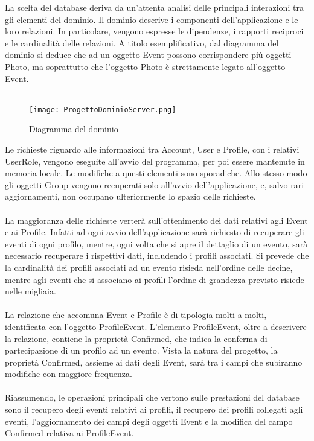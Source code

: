 La scelta del database deriva da un’attenta analisi delle principali interazioni tra gli elementi del dominio. 
Il dominio descrive i componenti dell’applicazione e le loro relazioni. 
In particolare, vengono espresse le dipendenze, i rapporti reciproci e le cardinalità delle relazioni. 
A titolo esemplificativo, dal diagramma del dominio si deduce che ad un oggetto Event possono corrispondere più oggetti Photo, 
ma soprattutto che l’oggetto Photo è strettamente legato all’oggetto Event.\\
\\
\begin{figure}[h!]
    \centering
    \texttt{[image: ProgettoDominioServer.png]}
    \caption{Diagramma del dominio}
\end{figure}
Le richieste riguardo alle informazioni tra Account, User e Profile, con i relativi UserRole, vengono eseguite all’avvio del programma, per poi essere mantenute in memoria locale. 
Le modifiche a questi elementi sono sporadiche.
Allo stesso modo gli oggetti Group vengono recuperati solo all’avvio dell’applicazione, e, salvo rari aggiornamenti, non occupano ulteriormente lo spazio delle richieste.\\
\\
La maggioranza delle richieste verterà sull’ottenimento dei dati relativi agli Event e ai Profile. 
Infatti ad ogni avvio dell’applicazione sarà richiesto di recuperare gli eventi di ogni profilo, mentre, ogni volta che si apre il dettaglio di un evento, 
sarà necessario recuperare i rispettivi dati, includendo i profili associati. 
Si prevede che la cardinalità dei profili associati ad un evento risieda nell’ordine delle decine, 
mentre agli eventi che si associano ai profili l’ordine di grandezza previsto risiede nelle migliaia. \\
\\

La relazione che accomuna Event e Profile è di tipologia molti a molti, identificata con l’oggetto ProfileEvent. 
L’elemento ProfileEvent, oltre a descrivere la relazione, contiene la proprietà Confirmed, che indica la conferma di partecipazione di un profilo ad un evento. 
Vista la natura del progetto, la proprietà Confirmed, assieme ai dati degli Event, sarà tra i campi che subiranno modifiche con maggiore frequenza.\\
\\
Riassumendo, le operazioni principali che vertono sulle prestazioni del database sono il recupero degli eventi relativi ai profili, il recupero dei profili collegati agli eventi, 
l’aggiornamento dei campi degli oggetti Event e la modifica del campo Confirmed relativa ai ProfileEvent.\\
\\

